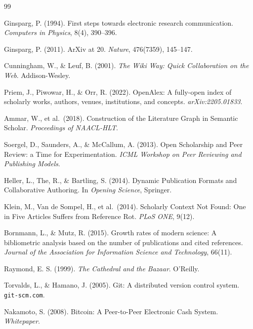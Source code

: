 \documentclass[11pt]{rrxiv}
\begin{document}
\begin{thebibliography}{99}

Ginsparg, P. (1994). First steps towards electronic research communication. \emph{Computers in Physics}, 8(4), 390--396.

Ginsparg, P. (2011). ArXiv at 20. \emph{Nature}, 476(7359), 145--147.

Cunningham, W., \& Leuf, B. (2001). \emph{The Wiki Way: Quick Collaboration on the Web}. Addison-Wesley.

Priem, J., Piwowar, H., \& Orr, R. (2022). OpenAlex: A fully-open index of scholarly works, authors, venues, institutions, and concepts. \emph{arXiv:2205.01833}.

Ammar, W., et al.\ (2018). Construction of the Literature Graph in Semantic Scholar. \emph{Proceedings of NAACL-HLT}.

Soergel, D., Saunders, A., \& McCallum, A. (2013). Open Scholarship and Peer Review: a Time for Experimentation. \emph{ICML Workshop on Peer Reviewing and Publishing Models}.

Heller, L., The, R., \& Bartling, S. (2014). Dynamic Publication Formats and Collaborative Authoring. In \emph{Opening Science}, Springer.

Klein, M., Van de Sompel, H., et al.\ (2014). Scholarly Context Not Found: One in Five Articles Suffers from Reference Rot. \emph{PLoS ONE}, 9(12).

Bornmann, L., \& Mutz, R. (2015). Growth rates of modern science: A bibliometric analysis based on the number of publications and cited references. \emph{Journal of the Association for Information Science and Technology}, 66(11).

Raymond, E. S. (1999). \emph{The Cathedral and the Bazaar}. O'Reilly.

Torvalds, L., \& Hamano, J. (2005). Git: A distributed version control system. \texttt{git-scm.com}.

Nakamoto, S. (2008). Bitcoin: A Peer-to-Peer Electronic Cash System. \emph{Whitepaper}.


\end{thebibliography}
\end{document}
